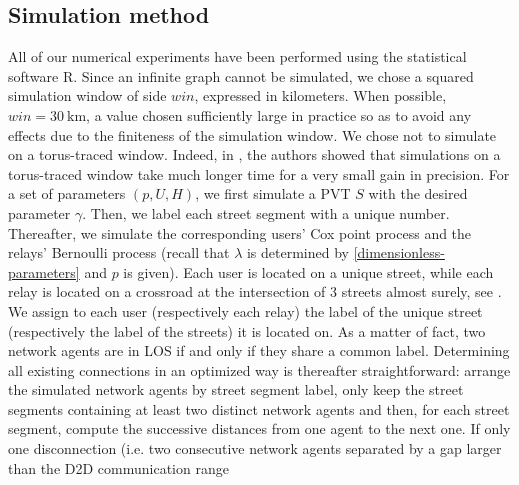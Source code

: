 \documentclass[conference]{IEEEtran}
\begin{document}
\subsection{Simulation method}
All of our numerical experiments have been performed using the statistical software R. Since an infinite graph cannot be simulated, we chose a squared simulation window of side $win$, expressed in kilometers. When possible, $win = 30 \: \text{km}$, a value chosen sufficiently large in practice so as to avoid any effects due to the finiteness of the simulation window. We chose not to simulate on a torus-traced window. Indeed, in \cite{cali2018percolation,mertens_continuum_2012}, the authors showed that simulations on a torus-traced window take much longer time for a very small gain in precision.
\indent For a set of parameters $(p,U,H)$, we first simulate a PVT $S$ with the desired parameter $\gamma$. Then, we label each street segment with a unique number. Thereafter, we simulate the corresponding users' Cox point process
and the relays' Bernoulli process (recall that $\lambda$ is determined by \eqref{dimensionless-parameters} and $p$ is given).
Each user is located on a unique street, while each relay is located on a crossroad at the intersection of 3 streets almost surely, see \cite{okabe2009spatial}. We assign to each user (respectively each relay) the label of the unique street (respectively the label of the streets) it is located on. As a matter of fact, two network agents are in LOS if and only if they share a common label. Determining all existing connections in an optimized way is thereafter straightforward: arrange the simulated network agents by street segment label, only keep the street segments containing at least two distinct network agents and then, for each street segment, compute the successive distances from one agent to the next one. If only one disconnection (i.e. two consecutive network agents separated by a gap larger than the D2D communication range
\end{document}
